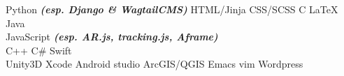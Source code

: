 \documentclass[a4paper]{deedy-resume} %
\begin{document}
\begin{minipage}[t]{0.33\textwidth}
Python {\footnotesize \textit{\textbf{(esp. Django \& WagtailCMS)}}} \textbullet{} HTML/Jinja \textbullet{} CSS/SCSS \textbullet{}
C \textbullet{} \LaTeX\ \textbullet{} Java \\
JavaScript {\footnotesize \textit{\textbf{(esp. AR.js, tracking.js, Aframe)}}} \\ \textbullet{} C++ \textbullet{} C\# \textbullet{} Swift \\
Unity3D \textbullet{} Xcode \textbullet{} Android studio \textbullet{} ArcGIS/QGIS
Emacs \textbullet{} vim \textbullet{} Wordpress \\

\sectionspace %


\end{minipage} %
\hfill
%
%
\end{document}
